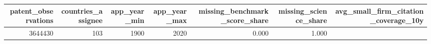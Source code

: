 \begin{tabular}{rrrrrrr}
\toprule
patent_observations & countries_assignee & app_year_min & app_year_max & missing_benchmark_score_share & missing_science_share & avg_small_firm_citation_coverage_10y \\
\midrule
3644430 & 103 & 1900 & 2020 & 0.000 & 1.000 &  \\
\bottomrule
\end{tabular}
